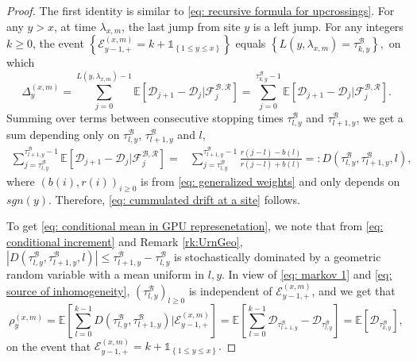\documentclass[twoside,12pt, a4paper]{article}
\numberwithin{equation}{section}
\theoremstyle{remark}
\newcommand{\abs}[1]{\left\vert #1 \right\vert}
\begin{document}
	\begin{proof} 
		The first identity is similar to \eqref{eq: recursive formula for upcrossings}.
		For any $y>x $, at time $\lambda_{x,m}$, the last jump from site $y$ is a left jump. For any integers $k\geq 0$, the event 
		$\left\{ \mathcal{E}^{(x,m)}_{y-1,+} =k +  \mathbb{1}_{\left\{1\leq y\leq x\right\}}\right\}$ equals $\left\{  L(y,\lambda_{x,m}) = \tau_{k,y}^{\mathcal{B}} \right\}, $ on which
		\[
		\Delta_{y}^{(x,m)} =\sum_{j=0}^{ L(y,\lambda_{x,m})-1} \mathbb{E}\left[ \mathcal{D}_{j+1} -\mathcal{D}_{j}  \vert \mathcal{F}^{\mathcal{B},\mathcal{R}}_{j} \right] = \sum_{j=0}^{\tau^\mathcal{B}_{k,y}-1} \mathbb{E}\left[ \mathcal{D}_{j+1} -\mathcal{D}_{j}  \vert \mathcal{F}^{\mathcal{B},\mathcal{R}}_{j} \right].  
		\] 
		Summing over terms between consecutive stopping times $\tau^{{\mathcal{B}}}_{l,y} $ and $\tau^{\mathcal{B}}_{l+1,y} $,  we get a sum depending only on $\tau^{\mathcal{B}}_{l,y} $, $\tau^{\mathcal{B}}_{l+1,y} $ and $l$, 
		\begin{align} \label{eq: conditional increment}
			\sum_{j=\tau^{\mathcal{B}}_{l,y}}^{\tau^{\mathcal{B}}_{l+1,y}-1} \mathbb{E}\left[ \mathcal{D}_{j+1} - \mathcal{D}_{j}  \vert \mathcal{F}^{\mathcal{B},\mathcal{R}}_{j} \right] =&
			\sum_{j=\tau^{\mathcal{B}}_{l,y}}^{\tau^{\mathcal{B}}_{l+1,y}-1} \frac{ r( j-l) - b(l)  }{ r( j-l) + b(l)  } 
			=:  D\left(\tau^{\mathcal{B}}_{l,y},\tau^{\mathcal{B}}_{l+1,y},l\right),
		\end{align}   
		where $(b(i),r(i))_{i\geq 0}$ is from \eqref{eq: generalized weights} and only depends on $sgn(y)$. Therefore, \eqref{eq: cummulated drift at a site} follows.
		
	To get \eqref{eq: conditional mean in GPU represenetation}, we note that from \eqref{eq: conditional increment} and Remark \ref{rk:UrnGeo}, $\abs{  D\left(\tau^{\mathcal{B}}_{l,y},\tau^{\mathcal{B}}_{l+1,y},l\right)} \leq  \tau^{\mathcal{B}}_{l+1,y}-\tau^{\mathcal{B}}_{l,y}$ is stochastically dominated by a geometric random variable with a mean uniform in $l, y$. In view of \eqref{eq: markov 1} and \eqref{eq: source of inhomogeneity},  $\left(\tau^{\mathcal{B}}_{l,y}\right)_{l \geq 0} $ is independent of $ \mathcal{E}^{(x,m)}_{y-1,+}$, and we get that 
		\begin{equation*} 
			\rho_{y}^{(x,m)} = \mathbb{E}\left[ \sum_{l=0 }^{ k -1  }  D(\tau^{\mathcal{B}}_{l,y},\tau^{\mathcal{B}}_{l+1,y} ) \vert \mathcal{E}^{(x,m)}_{y-1,+} \right]	= \mathbb{E}\left[ \sum_{l=0}^{k-1}  \mathcal{D}_{\tau^{\mathcal{B}}_{l+1,y}} -\mathcal{D}_{\tau^{\mathcal{B}}_{l,y}} \right]  
			= \mathbb{E}\left[  \mathcal{D}_{\tau^{\mathcal{B}}_{k,y}} \right],
		\end{equation*}
	on the event that $\mathcal{E}^{(x,m)}_{y-1,+} = k + \mathbb{1}_{\left\{1\leq y\leq x\right\}}.  $ 
	\end{proof}
	
\end{document}
